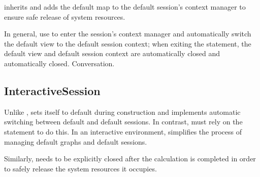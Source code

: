 \begin{content}
\begin{content}
 inherits  and adds the default map to the default session's context manager to ensure safe release of system resources.

In general, use  to enter the session's context manager and automatically switch the default view to the default session context; when exiting the  statement, the default view and default session context are automatically closed and automatically closed. Conversation.


\subsection{InteractiveSession}

Unlike ,  sets itself to default during construction and implements automatic switching between default and default sessions. In contrast,  must rely on the  statement to do this. In an interactive environment,  simplifies the process of managing default graphs and default sessions.

Similarly,  needs to be explicitly closed after the calculation is completed in order to safely release the system resources it occupies.


\end{content}
\end{content}
